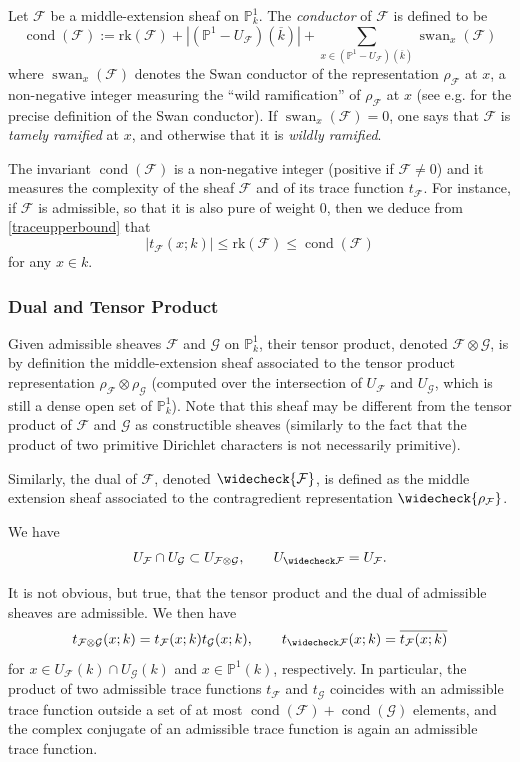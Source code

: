 \documentclass[12pt,a4paper,reqno]{amsart}
\numberwithin{equation}{section}
\DeclareMathOperator\swan{swan}
\DeclareMathOperator*\cond{cond}
\theoremstyle{plain}
\theoremstyle{definition}
\newcommand\rk{\mathrm{rk}}
\newcommand\ov{\overline}
\newcommand\wcheck{\widecheck}
\newcommand\mcF{\mathcal{F}}
\newcommand\mcG{\mathcal{G}}
\newcommand\Pl{\mathbb{P}^1}
\begin{document}
Let $\mcF$ be a middle-extension sheaf on $\Pl_{k}$. The
\emph{conductor} of $\mcF$ is defined to be
$$
\cond(\mcF):=\rk(\mcF)+|(\Pl-U_{\mcF})(\ov{k})|+\sum_{x\in (\Pl-
  U_\mcF)(\overline k)}\swan_x(\mcF)
$$
where $\swan_x(\mcF)$ denotes the Swan conductor of the representation
$\rho_\mcF$ at $x$, a non-negative integer measuring the ``wild
ramification'' of $\rho_{\mcF}$ at $x$ (see e.g. \cite[Definition
1.6]{GKM} for the precise definition of the Swan conductor).  If
$\swan_x(\mcF)=0$, one says that $\mcF$ is \emph{tamely ramified} at
$x$, and otherwise that it is \emph{wildly ramified}.
\par
The invariant $\cond(\mcF)$ is a non-negative integer (positive if
$\mcF\neq 0$) and it measures the complexity of the sheaf
$\mcF$ and of its trace function $t_\mcF$.  For instance, if $\mcF$ is
admissible, so that it is also pure of weight $0$, then we deduce from
\eqref{traceupperbound} that
\begin{equation}\label{traceupperbound-2}
|t_\mcF(x;k)| \leq \rk(\mcF) \leq \cond(\mcF)
\end{equation}
for any $x\in k$.

\subsubsection{Dual and Tensor Product} Given admissible sheaves
$\mcF$ and $\mcG$ on $\Pl_k$, their tensor product, denoted
$\mcF\otimes\mcG$, is by definition the middle-extension sheaf
associated to the tensor product representation
$\rho_\mcF\otimes\rho_\mcG$ (computed over the intersection of
$U_{\mcF}$ and $U_{\mcG}$, which is still a dense open set of
$\Pl_k$). Note that this sheaf may be different from the tensor product
of $\mcF$ and $\mcG$ as constructible sheaves (similarly to the fact
that the product of two primitive Dirichlet characters is not
necessarily primitive).

Similarly, the dual of $\mcF$, denoted $\wcheck{\mcF}$, is defined as
the middle extension sheaf associated to the contragredient
representation $\wcheck{\rho_\mcF}$.

We have
$$
U_\mcF\cap U_\mcG\subset U_{\mcF\otimes\mcG},\quad\quad U_{\wcheck
  \mcF}=U_{\mcF}.
$$

It is not obvious,
but true, that the tensor product and the dual of
admissible sheaves are admissible. We then have
\begin{equation}\label{hom}
  t_{\mcF\otimes\mcG}(x;k)=t_{\mcF}(x;k)t_{\mcG}(x;k),\quad\quad
  t_{\wcheck\mcF}(x;k)=\ov{t_{\mcF}(x;k)}
\end{equation}
for $x \in U_\mcF(k) \cap U_\mcG(k)$ and $x \in \Pl(k)$, respectively.
In particular, the product of two admissible trace functions
$t_{\mcF}$ and $t_{\mcG}$ coincides with an admissible trace function
outside a set of at most $\cond(\mcF)+\cond(\mcG)$ elements, and the complex
conjugate of an admissible trace function is again an admissible trace function.
\end{document}
